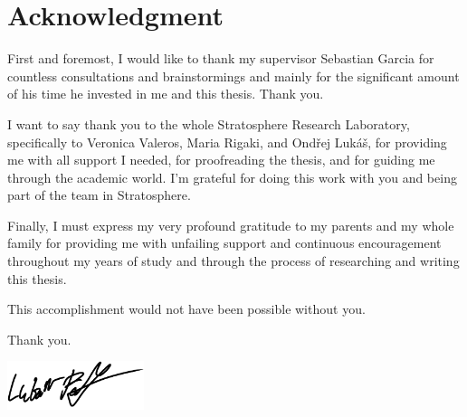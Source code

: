 \vspace*{\fill}

\section*{Acknowledgment}
First and foremost, I would like to thank my supervisor Sebastian Garcia for countless consultations and brainstormings and mainly for the significant amount of his time he invested in me and this thesis. Thank you.

I want to say thank you to the whole Stratosphere Research Laboratory, specifically to Veronica Valeros, Maria Rigaki, and Ondřej Lukáš, for providing me with all support I needed, for proofreading the thesis, and for guiding me through the academic world.
I'm grateful for doing this work with you and being part of the team in Stratosphere.

Finally, I must express my very profound gratitude to my parents and my whole family for providing me with unfailing support and continuous encouragement throughout my years of study and through the process of researching and writing this thesis. 

\bigskip \noindent
This accomplishment would not have been possible without you.
  
\bigskip \noindent
Thank you.
  
\bigskip \noindent
\hspace*{0.7\textwidth} \includegraphics[width=0.3\textwidth]{assets/signature.png}

\thispagestyle{empty}

\cleardoublepage